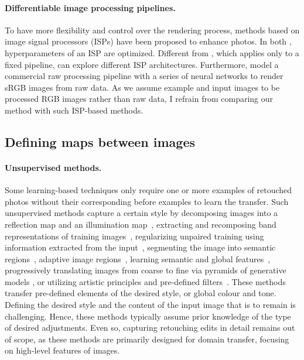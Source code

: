 \paragraph{Differentiable image processing pipelines.} To have more flexibility and control over the rendering process, methods based on image signal processors (ISPs) have been proposed to enhance photos. In both \cite{tseng2019hyperparameter, yu2021reconfigisp}, hyperparameters of an ISP are optimized. Different from \cite{tseng2019hyperparameter}, which applies only to a fixed pipeline, \citeauthor{yu2021reconfigisp} \cite{yu2021reconfigisp} can explore different ISP architectures. Furthermore, \citeauthor{tseng2022neural} \cite{tseng2022neural} model a commercial raw processing pipeline with a series of neural networks to render sRGB images from raw data. As we assume example and input images to be processed RGB images rather than raw data, I refrain from comparing our method with such ISP-based methods.

\subsection{Defining maps between images}

\paragraph{Unsupervised methods.} Some learning-based techniques only require one or more examples of retouched photos without their corresponding before examples to learn the transfer. Such unsupervised methods capture a certain style by decomposing images into a reflection map and an illumination map~\cite{ma2021retinexgan}, extracting and recomposing band representations of training images~\cite{yang2020fidelity}, regularizing unpaired training using information extracted from the input~\cite{9334429}, segmenting the image into semantic regions~\cite{Liu16Makeup}, adaptive image regions~\cite{Frigo16Split}, learning semantic and global features~\cite{Chen18Deep}, progressively translating images from coarse to fine via pyramids of generative models \cite{lin2020tuigan}, or utilizing artistic principles and pre-defined filters~\cite{Zhang13Style,Hu18Exposure}. These methods transfer pre-defined elements of the desired style, or global colour and tone. Defining the desired style and the content of the input image that is to remain is challenging. Hence, these methods typically assume prior knowledge of the type of desired adjustments. Even so, capturing retouching edits in detail remains out of scope, as these methods are primarily designed for domain transfer, focusing on high-level features of images.

